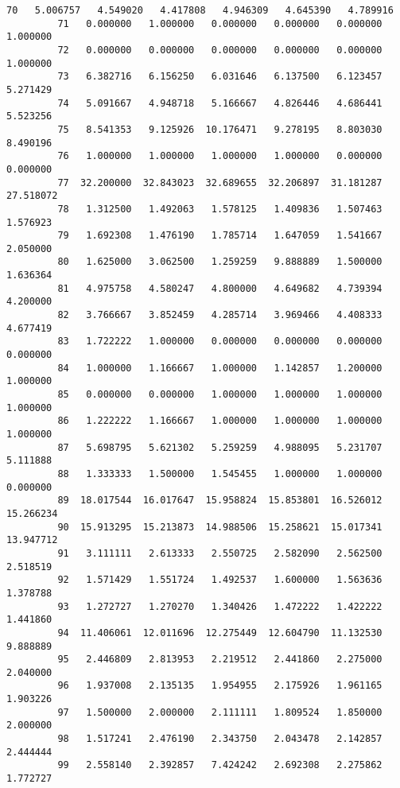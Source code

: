 \documentclass[11pt]{article}
\begin{document}
\begin{Verbatim}[commandchars=\\\{\}]
         70   5.006757   4.549020   4.417808   4.946309   4.645390   4.789916   
         71   0.000000   1.000000   0.000000   0.000000   0.000000   1.000000   
         72   0.000000   0.000000   0.000000   0.000000   0.000000   1.000000   
         73   6.382716   6.156250   6.031646   6.137500   6.123457   5.271429   
         74   5.091667   4.948718   5.166667   4.826446   4.686441   5.523256   
         75   8.541353   9.125926  10.176471   9.278195   8.803030   8.490196   
         76   1.000000   1.000000   1.000000   1.000000   0.000000   0.000000   
         77  32.200000  32.843023  32.689655  32.206897  31.181287  27.518072   
         78   1.312500   1.492063   1.578125   1.409836   1.507463   1.576923   
         79   1.692308   1.476190   1.785714   1.647059   1.541667   2.050000   
         80   1.625000   3.062500   1.259259   9.888889   1.500000   1.636364   
         81   4.975758   4.580247   4.800000   4.649682   4.739394   4.200000   
         82   3.766667   3.852459   4.285714   3.969466   4.408333   4.677419   
         83   1.722222   1.000000   0.000000   0.000000   0.000000   0.000000   
         84   1.000000   1.166667   1.000000   1.142857   1.200000   1.000000   
         85   0.000000   0.000000   1.000000   1.000000   1.000000   1.000000   
         86   1.222222   1.166667   1.000000   1.000000   1.000000   1.000000   
         87   5.698795   5.621302   5.259259   4.988095   5.231707   5.111888   
         88   1.333333   1.500000   1.545455   1.000000   1.000000   0.000000   
         89  18.017544  16.017647  15.958824  15.853801  16.526012  15.266234   
         90  15.913295  15.213873  14.988506  15.258621  15.017341  13.947712   
         91   3.111111   2.613333   2.550725   2.582090   2.562500   2.518519   
         92   1.571429   1.551724   1.492537   1.600000   1.563636   1.378788   
         93   1.272727   1.270270   1.340426   1.472222   1.422222   1.441860   
         94  11.406061  12.011696  12.275449  12.604790  11.132530   9.888889   
         95   2.446809   2.813953   2.219512   2.441860   2.275000   2.040000   
         96   1.937008   2.135135   1.954955   2.175926   1.961165   1.903226   
         97   1.500000   2.000000   2.111111   1.809524   1.850000   2.000000   
         98   1.517241   2.476190   2.343750   2.043478   2.142857   2.444444   
         99   2.558140   2.392857   7.424242   2.692308   2.275862   1.772727   
         

\end{Verbatim}
\end{document}

